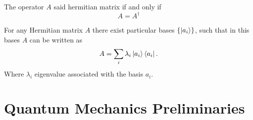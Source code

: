 \begin{defn}

The  operator $A$ said hermitian matrix if and only if $$A=A^\dagger$$
\end{defn}

\begin{prop}\label{DIA}
For any Hermitian matrix $A$ there exist particular  bases $\{\ket{a_i}\}$, such that in this bases  $A$ can be written as
\begin{equation}
A=\sum_i \lambda_i \ket{a_i}\bra{a_i}.
\end{equation}
Where $\lambda_i$ eigenvalue associated with the basis $a_i$.
\end{prop}

\section{ Quantum Mechanics Preliminaries }
